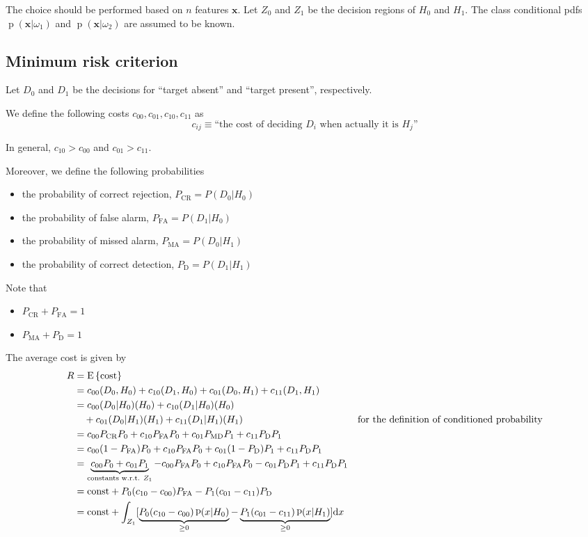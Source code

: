 \documentclass[oneside,onecolumn]{report}
\newcommand{\E}[1]{\text{E} \left\{ #1 \right\}}
\DeclareMathOperator*{\pdf}{p}
\let\P\relax
\DeclareMathOperator*{\P}{P}
\begin{document}
The choice should be performed based on $n$ features $\bm x$.
Let $Z_0$ and $Z_1$ be the decision regions of $H_0$ and $H_1$.
The class conditional pdfs $\pdf(\bm x | \omega_1)$ and $\pdf(\bm x | \omega_2)$ are assumed to be known.

\subsection{Minimum risk criterion}
Let $D_0$ and $D_1$ be the decisions for ``target absent'' and ``target present'', respectively.

We define the following costs $c_{00}, c_{01}, c_{10}, c_{11}$ as
$$ c_{i j} \equiv \text{``the cost of deciding } D_i \text{ when actually it is } H_j \text{''} $$

In general, $c_{10} > c_{00}$ and $c_{01} > c_{11}$.

Moreover, we define the following probabilities
\begin{itemize}
    \item the probability of correct rejection, $P_\text{CR} = P(D_0 | H_0)$
    \item the probability of false alarm, $P_\text{FA} = P(D_1 | H_0)$
    \item the probability of missed alarm, $P_\text{MA} = P(D_0 | H_1)$
    \item the probability of correct detection, $P_\text{D} = P(D_1 | H_1)$
\end{itemize}

Note that
\begin{itemize}
    \item $P_\text{CR} + P_\text{FA} = 1$
    \item $P_\text{MA} + P_\text{D} = 1$
\end{itemize}

The average cost is given by
\begin{align*}
    R
    &= \E{\text{cost}} \\
    &= c_{00} \P(D_0, H_0) + c_{10} \P(D_1, H_0) + c_{01} \P(D_0, H_1) + c_{11} \P(D_1, H_1) \\
    &= c_{00} \P(D_0 | H_0) \P(H_0) + c_{10} \P(D_1 | H_0) \P(H_0) \\
    &\quad + c_{01} \P(D_0 | H_1) \P(H_1) + c_{11} \P(D_1 | H_1) \P(H_1) & \text{for the definition of conditioned probability} \\
    &= c_{00} P_\text{CR} P_0 + c_{10} P_\text{FA} P_0 + c_{01} P_\text{MD} P_1 + c_{11} P_\text{D} P_1 \\
    &= c_{00} (1 - P_\text{FA}) P_0 + c_{10} P_\text{FA} P_0 + c_{01} (1 - P_\text{D}) P_1 + c_{11} P_\text{D} P_1 \\
    &= \underbrace{c_{00} P_0 + c_{01} P_1}_\text{constants w.r.t. $Z_1$} - c_{00} P_\text{FA} P_0 + c_{10} P_\text{FA} P_0 - c_{01} P_\text{D} P_1 + c_{11} P_\text{D} P_1 \\
    &= \text{const} + P_0 (c_{10} - c_{00}) P_\text{FA} - P_1 (c_{01} - c_{11}) P_\text{D} \\
    &= \text{const} + \int_{Z_1} [ \underbrace{P_0 (c_{10} - c_{00}) \pdf(x | H_0)}_{\geq 0} - \underbrace{P_1 (c_{01} - c_{11}) \pdf(x | H_1)}_{\geq 0} ] \dd x
\end{align*}
\end{document}
